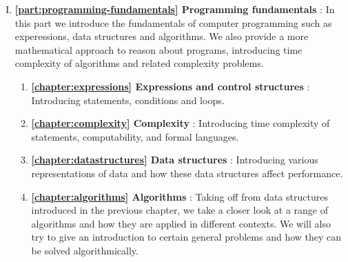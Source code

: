 \begin{enumerate}[I.]
	\item \textbf{\autoref{part:programming-fundamentals} Programming fundamentals} : In this part we introduce the fundamentals of computer programming such as experessions, data structures and algorithms. We also provide a more mathematical approach to reason about programs, introducing time complexity of algorithms and related complexity problems.
		\begin{enumerate}[1.]
			\item \textbf{\autoref{chapter:expressions} Expressions and control structures} : Introducing statements, conditions and loops.
			\item \textbf{\autoref{chapter:complexity} Complexity} : Introducing time complexity of statements, computability, and formal languages.
			\item \textbf{\autoref{chapter:datastructures} Data structures} : Introducing various representations of data and how these data structures affect performance.
			\item \textbf{\autoref{chapter:algorithms} Algorithms} : Taking off from data structures introduced in the previous chapter, we take a closer look at a range of algorithms and how they are applied in different contexts. We will also try to give an introduction to certain general problems and how they can be solved algorithmically.
		\end{enumerate}




\end{enumerate}
